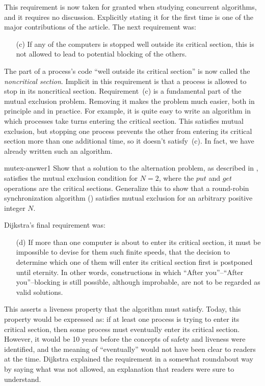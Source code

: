 \documentclass[fleqn,leqno]{article}
\begin{document}
This requirement is now taken for granted when studying concurrent
algorithms, and it requires no discussion.  Explicitly stating it for
the first time is one of the major contributions of the article.
The next requirement was:
\begin{itemize}
\item[(c)] If any of the computers is stopped well outside its
critical section, this is not allowed to lead to potential blocking of
the others.
\end{itemize}
The part of a process's code ``well outside its critical section'' is
now called the \emph{noncritical 
section}.  Implicit in this requirement is that a process is allowed
to stop in its noncritical section.  Requirement~(c) is a fundamental
part of the mutual exclusion problem.  Removing it makes the problem
much easier, both in principle and in practice.  For example, it is
quite easy to write an algorithm in which processes take turns
entering the critical section.  This satisfies mutual exclusion, but
stopping one process prevents the other from entering its critical
section more than one additional time, so it doesn't satisfy~(c).  In fact, we
have already written such an algorithm.
\begin{hproblem}{mutex-answer1} \sloppy
Show that a solution to the alternation problem, as described
in ,
satisfies the mutual exclusion condition for $N=2$, where
the $put$ and $get$ operations are the critical sections.
Generalize this to show that a round-robin synchronization
algorithm ()
satisfies mutual exclusion for an arbitrary positive
integer $N$.
\end{hproblem}
%
Dijkstra's final requirement was:
\begin{itemize}
\item[(d)] If 
more than one computer is about to enter its critical
section, it must be impossible to devise for them such finite speeds,
that the decision to determine which one of them will enter its
critical section first is postponed until eternity.  In other words,
constructions in which ``After you''--``After you''--blocking is
still possible, although improbable, are not to be regarded as valid
solutions.
\end{itemize}
This asserts a liveness property that the algorithm must satisfy.
Today, this property would be expressed as: if at least one process is
trying to enter its critical section, then some process must
eventually enter its critical section.  However, it would be 10 years
before the concepts of safety and liveness were identified, and the
meaning of ``eventually'' would not have been clear to readers at the
time.  Dijkstra explained the requirement in a somewhat roundabout way
by saying what was not allowed, an explanation that readers were sure
to understand.
\end{document}
